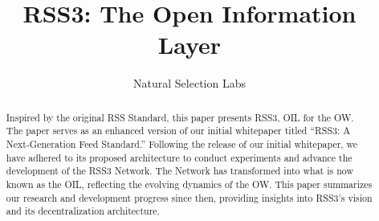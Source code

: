 \documentclass[conference]{IEEEtran}
\begin{document}
\title{RSS3: The Open Information Layer}

\author{Natural Selection Labs}
\maketitle

\thispagestyle{plain}
\pagestyle{plain}

\begin{abstract}

Inspired by the original RSS Standard, this paper presents RSS3, \acrlong{OIL} for the \acrlong{OW}. The paper serves as an enhanced version of our initial whitepaper titled ``RSS3: A Next-Generation Feed Standard.'' Following the release of our initial whitepaper, we have adhered to its proposed architecture to conduct experiments and advance the development of the RSS3 Network. The Network has transformed into what is now known as the \acrlong{OIL}, reflecting the evolving dynamics of the \acrlong{OW}. This paper summarizes our research and development progress since then, providing insights into RSS3's vision and its decentralization architecture.

\end{abstract}












\printglossary[type=main,title=Glossary, toctitle=Glossary]



% 
% 
\end{document}
